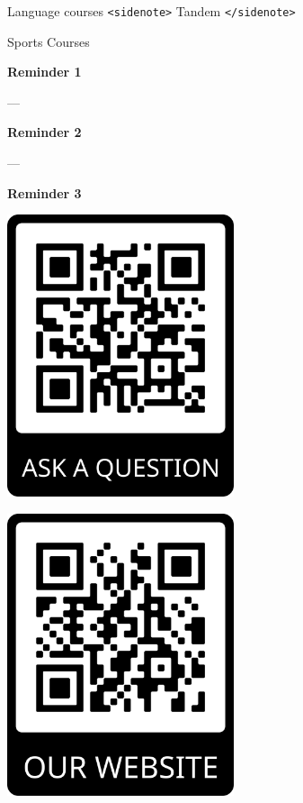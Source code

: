 \documentclass[aspectratio=169,hyperref={unicode}]{beamer}
\begin{document}
\begin{frame}{Language courses}
\texttt{<sidenote>}
Tandem
\texttt{</sidenote>}	
\end{frame}


\begin{frame}{Sports Courses}
\end{frame}

\begin{frame}
\begin{center}
\textbf{Reminder 1}

---

\textbf{Reminder 2}

---

\textbf{Reminder 3}

\vspace{1em}

\begin{minipage}{0.4\textwidth}
\centering
    \includegraphics[width=0.5\textwidth]{../QRqa.png}
  \end{minipage}
  \hfill
  \begin{minipage}{0.4\textwidth}
  \centering
    \includegraphics[width=0.5\textwidth]{../QRweb.png}
  \end{minipage}
\end{center}
\end{frame}
\end{document}
